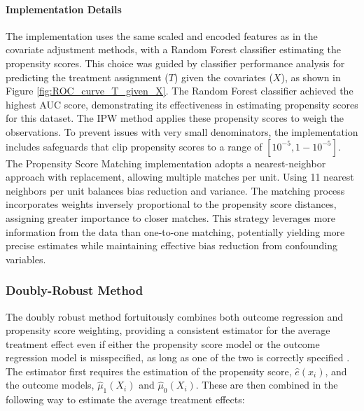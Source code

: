 \documentclass{article}
\begin{document}
\paragraph{Implementation Details} The implementation uses the same scaled and encoded features as in the covariate adjustment methods, with a Random Forest classifier estimating the propensity scores. This choice was guided by classifier performance analysis for predicting the treatment assignment (\(T\)) given the covariates (\(X\)), as shown in Figure \ref{fig:ROC_curve_T_given_X}. The Random Forest classifier achieved the highest AUC score, demonstrating its effectiveness in estimating propensity scores for this dataset.
The IPW method applies these propensity scores to weigh the observations. To prevent issues with very small denominators, the implementation includes safeguards that clip propensity scores to a range of $[10^{-5}, 1-10^{-5}]$.
The Propensity Score Matching implementation adopts a nearest-neighbor approach with replacement, allowing multiple matches per unit. Using 11 nearest neighbors per unit balances bias reduction and variance. The matching process incorporates weights inversely proportional to the propensity score distances, assigning greater importance to closer matches. This strategy leverages more information from the data than one-to-one matching, potentially yielding more precise estimates while maintaining effective bias reduction from confounding variables.

\subsubsection{Doubly-Robust Method}

The doubly robust method fortuitously combines both outcome regression and propensity score weighting, providing a consistent estimator for the average treatment effect even if either the propensity score model or the outcome regression model is misspecified, as long as one of the two is correctly specified \citep{bang2005doubly}. The estimator first requires the estimation of the propensity score, $\hat{e}(x_i)$, and the outcome models, $\hat{\mu}_1(X_i)$ and $\hat{\mu}_0(X_i)$. These are then combined in the following way to estimate the average treatment effects:
\end{document}
